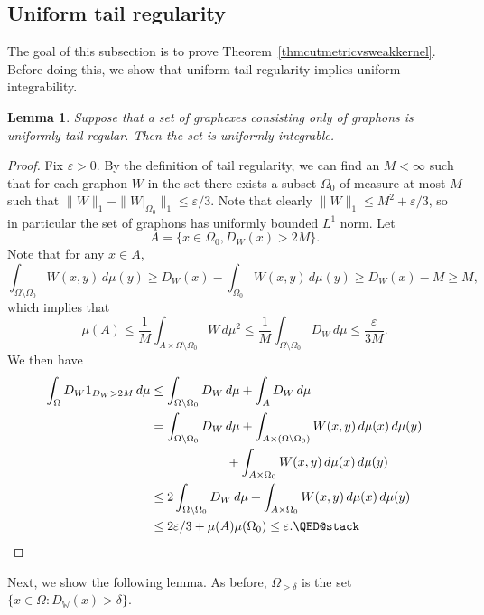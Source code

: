 \documentclass{amsart}
\numberwithin{equation}{section}
\numberwithin{figure}{section}
\newtheorem{lemma}[theorem]{Lemma}
\theoremstyle{definition}
\theoremstyle{remark}
\newcommand{\cW}{\mathbb{W}}
\begin{document}
\subsection{Uniform tail regularity}

The goal of this subsection is to prove
Theorem~\ref{thmcutmetricvsweakkernel}. Before doing this, we show that
uniform tail regularity implies uniform integrability.

\begin{lemma}\label{lem:tail-reg-implies-UI} Suppose that a set
of graphexes consisting only of graphons is uniformly tail regular. Then the
set is uniformly integrable.
\end{lemma}

\begin{proof}
Fix $\varepsilon>0$. By the definition of tail regularity, we can find an
$M<\infty$ such that for each graphon $W$ in the set there exists a subset
$\Omega_0$ of measure at most $M$ such that
$\|W\|_1-\|W|_{\Omega_0}\|_1\leq\varepsilon/3$. Note that clearly
$\|W\|_1\leq M^2+\varepsilon/3$, so in particular the set of graphons has
uniformly bounded $L^1$ norm. Let
\[A=\{x \in \Omega_0,D_W(x)>2M\}
.\] Note that for any $x\in A$,
\[\int_{\Omega \setminus \Omega_0} W(x,y)\,d\mu(y) \ge D_W(x)-\int_{\Omega_0}W(x,y)\,d\mu(y) \ge D_W(x)-M \ge M
,\] which implies that
\[
\mu(A) \le \frac 1M\int_{A\times\Omega\setminus\Omega_0}W \,d\mu^2\leq\frac 1M\int_{\Omega\setminus\Omega_0}D_W \,d\mu
\leq \frac{\varepsilon}{3M}.
\]
We then have
\begin{align*}
\int_\Omega D_{W}1_{D_{W}>2M} \,d\mu
&\leq\int_{\Omega\setminus\Omega_0} D_{W} \,d\mu +\int_A D_{W} \,d\mu\\
&= \int_{\Omega \setminus \Omega_0} D_W \,d\mu + \int_{A \times (\Omega \setminus \Omega_0)} W(x,y) \,d\mu(x) \,d\mu(y)\\
& \qquad \qquad \qquad \phantom{} + \int_{A \times \Omega_0} W(x,y) \,d\mu(x) \,d\mu(y)\\
&\le 2\int_{\Omega \setminus \Omega_0} D_W \,d\mu + \int_{A \times \Omega_0} W(x,y) \,d\mu(x) \,d\mu(y)\\
&\le 2\varepsilon/3 + \mu(A)\mu(\Omega_0)\le \varepsilon
.\qedhere\end{align*}
\end{proof}

Next, we show the following lemma. As before, $\Omega_{>\delta}$ is the set
$\{x \in \Omega: D_\cW(x) > \delta\}$.
\end{document}
